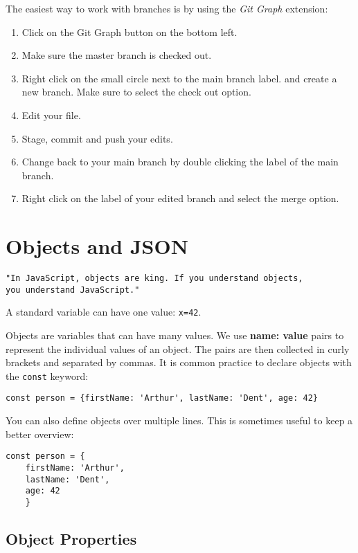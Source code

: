 \documentclass[english,11pt,a4paper]{report}
\begin{document}
The easiest way to work with branches is by using the \emph{Git Graph} extension:
\begin{enumerate}
\item Click on the Git Graph button on the bottom left.
\item Make sure the master branch is checked out.
\item Right click on the small circle next to the main branch label. and create a new branch. 
Make sure to select the check out option.
\item Edit your file.
\item Stage, commit and push your edits.
\item Change back to your main branch by double clicking the label of the main branch.
\item Right click on the label of your edited branch and select the merge option.
\end{enumerate}


\newpage


\section{Objects and JSON}

\begin{verbatim}
"In JavaScript, objects are king. If you understand objects, 
you understand JavaScript."
\end{verbatim}

A standard variable can have one value: \verb|x=42|.

Objects are variables that can have many values. We use {\bf name: value} pairs to represent the individual values of an object.  The pairs are then collected in curly brackets and separated by commas. It is common practice to declare objects with the \verb|const| keyword:

\verb|const person = {firstName: 'Arthur', lastName: 'Dent', age: 42}|

You can also define objects over multiple lines. This is sometimes useful to keep a better overview:
\begin{verbatim}
const person = {
	firstName: 'Arthur', 
	lastName: 'Dent', 
	age: 42
	}
\end{verbatim}

\subsection{Object Properties}
\end{document}

